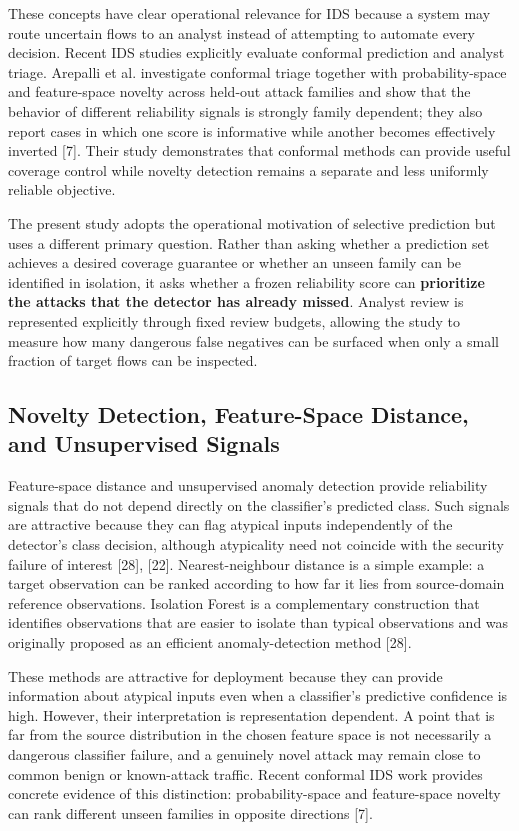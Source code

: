 \documentclass[conference]{IEEEtran}
\begin{document}
These concepts have clear operational relevance for IDS because a system may route uncertain flows to an analyst instead of attempting to automate every decision. Recent IDS studies explicitly evaluate conformal prediction and analyst triage. Arepalli et al. investigate conformal triage together with probability-space and feature-space novelty across held-out attack families and show that the behavior of different reliability signals is strongly family dependent; they also report cases in which one score is informative while another becomes effectively inverted [7]. Their study demonstrates that conformal methods can provide useful coverage control while novelty detection remains a separate and less uniformly reliable objective.

The present study adopts the operational motivation of selective prediction but uses a different primary question. Rather than asking whether a prediction set achieves a desired coverage guarantee or whether an unseen family can be identified in isolation, it asks whether a frozen reliability score can \textbf{prioritize the attacks that the detector has already missed}. Analyst review is represented explicitly through fixed review budgets, allowing the study to measure how many dangerous false negatives can be surfaced when only a small fraction of target flows can be inspected.

\subsection{Novelty Detection, Feature-Space Distance, and Unsupervised Signals}

Feature-space distance and unsupervised anomaly detection provide reliability signals that do not depend directly on the classifier's predicted class. Such signals are attractive because they can flag atypical inputs independently of the detector's class decision, although atypicality need not coincide with the security failure of interest [28], [22]. Nearest-neighbour distance is a simple example: a target observation can be ranked according to how far it lies from source-domain reference observations. Isolation Forest is a complementary construction that identifies observations that are easier to isolate than typical observations and was originally proposed as an efficient anomaly-detection method [28].

These methods are attractive for deployment because they can provide information about atypical inputs even when a classifier's predictive confidence is high. However, their interpretation is representation dependent. A point that is far from the source distribution in the chosen feature space is not necessarily a dangerous classifier failure, and a genuinely novel attack may remain close to common benign or known-attack traffic. Recent conformal IDS work provides concrete evidence of this distinction: probability-space and feature-space novelty can rank different unseen families in opposite directions [7].
\end{document}
